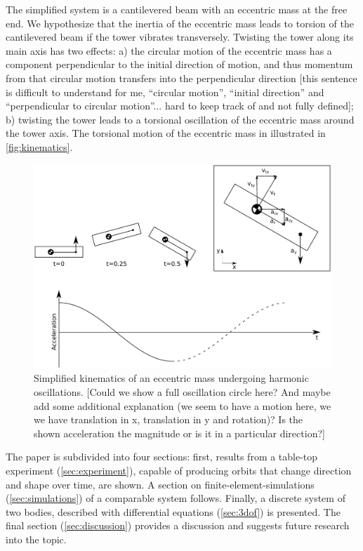 \documentclass{article}
\begin{document}
The simplified system is a cantilevered beam with an eccentric mass at the free end. We hypothesize that the inertia of the eccentric mass leads to torsion of the cantilevered beam if the tower vibrates transversely. Twisting the tower along its main axis has two effects: a) the circular motion of the eccentric mass has a component perpendicular to the initial direction of motion, and thus momentum from that circular motion transfers into the perpendicular direction [this sentence is difficult to understand for me, ``circular motion'', ``initial direction'' and ``perpendicular to circular motion''... hard to keep track of and not fully defined]; b) twisting the tower leads to a torsional oscillation of the eccentric mass around the tower axis. The torsional motion of the eccentric mass in illustrated in \autoref{fig:kinematics}.

\clearpage

\begin{figure}[ht!]
    \centering
    \includegraphics[width=0.7\linewidth]{figures/kinematics.pdf}
    \caption{Simplified kinematics of an eccentric mass undergoing harmonic oscillations. [Could we show a full oscillation circle here? And maybe add some additional explanation (we seem to have a motion here, we we have translation in x, translation in y and rotation)? Is the shown acceleration the magnitude or is it in a particular direction?]}
    \label{fig:kinematics}
\end{figure}

The paper is subdivided into four sections: first, results from a table-top experiment (\autoref{sec:experiment}), capable of producing orbits that change direction and shape over time, are shown. A section on finite-element-simulations (\autoref{sec:simulations}) of a comparable system follows. Finally, a discrete system of two bodies, described with differential equations (\autoref{sec:3dof}) is presented. The final section (\autoref{sec:discussion}) provides a discussion and suggests future research into the topic. 
\end{document}
